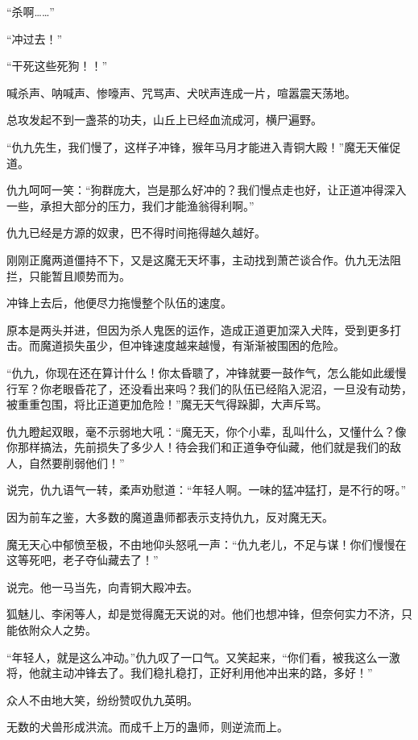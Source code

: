 
\begin{this_body}

“杀啊……”

“冲过去！”

“干死这些死狗！！”

喊杀声、呐喊声、惨嚎声、咒骂声、犬吠声连成一片，喧嚣震天荡地。

总攻发起不到一盏茶的功夫，山丘上已经血流成河，横尸遍野。

“仇九先生，我们慢了，这样子冲锋，猴年马月才能进入青铜大殿！”魔无天催促道。

仇九呵呵一笑：“狗群庞大，岂是那么好冲的？我们慢点走也好，让正道冲得深入一些，承担大部分的压力，我们才能渔翁得利啊。”

仇九已经是方源的奴隶，巴不得时间拖得越久越好。

刚刚正魔两道僵持不下，又是这魔无天坏事，主动找到萧芒谈合作。仇九无法阻拦，只能暂且顺势而为。

冲锋上去后，他便尽力拖慢整个队伍的速度。

原本是两头并进，但因为杀人鬼医的运作，造成正道更加深入犬阵，受到更多打击。而魔道损失虽少，但冲锋速度越来越慢，有渐渐被围困的危险。

“仇九，你现在还在算计什么！你太昏聩了，冲锋就要一鼓作气，怎么能如此缓慢行军？你老眼昏花了，还没看出来吗？我们的队伍已经陷入泥沼，一旦没有动势，被重重包围，将比正道更加危险！”魔无天气得跺脚，大声斥骂。

仇九瞪起双眼，毫不示弱地大吼：“魔无天，你个小辈，乱叫什么，又懂什么？像你那样搞法，先前损失了多少人！待会我们和正道争夺仙藏，他们就是我们的敌人，自然要削弱他们！”

说完，仇九语气一转，柔声劝慰道：“年轻人啊。一味的猛冲猛打，是不行的呀。”

因为前车之鉴，大多数的魔道蛊师都表示支持仇九，反对魔无天。

魔无天心中郁愤至极，不由地仰头怒吼一声：“仇九老儿，不足与谋！你们慢慢在这等死吧，老子夺仙藏去了！”

说完。他一马当先，向青铜大殿冲去。

狐魅儿、李闲等人，却是觉得魔无天说的对。他们也想冲锋，但奈何实力不济，只能依附众人之势。

“年轻人，就是这么冲动。”仇九叹了一口气。又笑起来，“你们看，被我这么一激将，他就主动冲锋去了。我们稳扎稳打，正好利用他冲出来的路，多好！”

众人不由地大笑，纷纷赞叹仇九英明。

无数的犬兽形成洪流。而成千上万的蛊师，则逆流而上。


\end{this_body}
